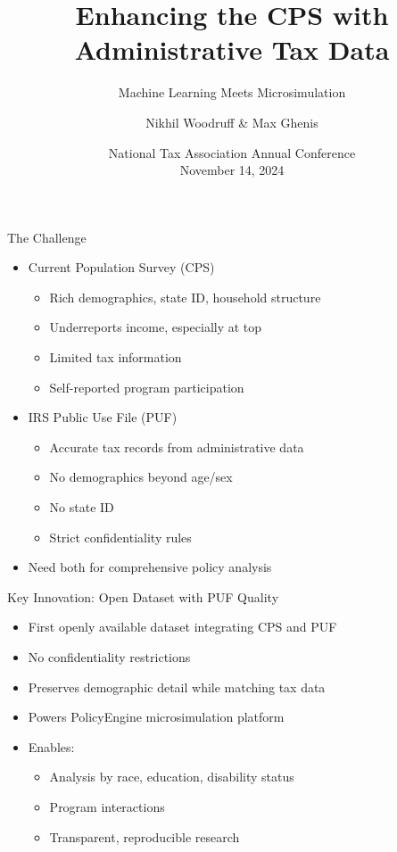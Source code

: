 \documentclass{beamer}
\title{Enhancing the CPS with Administrative Tax Data}
\subtitle{Machine Learning Meets Microsimulation}
\author[Woodruff \& Ghenis]{Nikhil Woodruff \& Max Ghenis}
\institute{PolicyEngine}
\date{National Tax Association Annual Conference\\November 14, 2024}
\begin{document}
\begin{frame}
    \titlepage
\end{frame}

\begin{frame}{The Challenge}
    \begin{itemize}
        \item Current Population Survey (CPS)
        \begin{itemize}
            \item Rich demographics, state ID, household structure
            \item Underreports income, especially at top
            \item Limited tax information
            \item Self-reported program participation
        \end{itemize}
        \item IRS Public Use File (PUF)
        \begin{itemize}
            \item Accurate tax records from administrative data
            \item No demographics beyond age/sex
            \item No state ID
            \item Strict confidentiality rules
        \end{itemize}
        \item Need both for comprehensive policy analysis
    \end{itemize}
\end{frame}

\begin{frame}{Key Innovation: Open Dataset with PUF Quality}
    \begin{itemize}
        \item First openly available dataset integrating CPS and PUF
        \item No confidentiality restrictions
        \item Preserves demographic detail while matching tax data
        \item Powers PolicyEngine microsimulation platform
        \item Enables:
        \begin{itemize}
            \item Analysis by race, education, disability status
            \item Program interactions
            \item Transparent, reproducible research
        \end{itemize}
    \end{itemize}
\end{frame}
\end{document}
